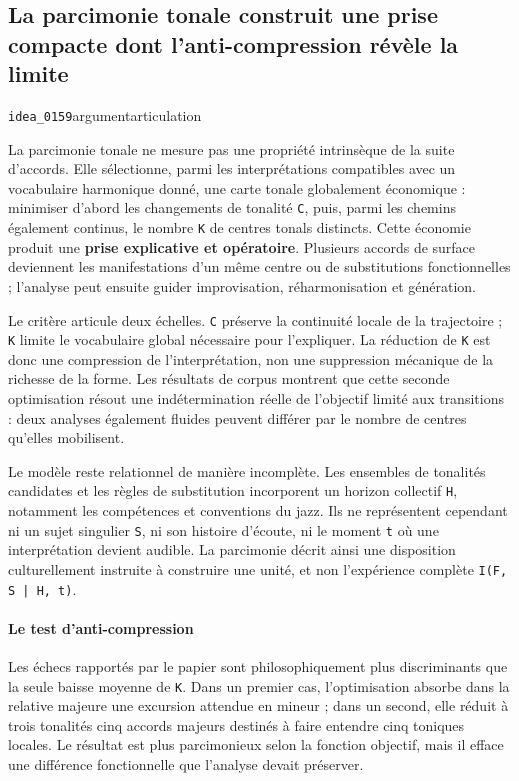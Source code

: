 \documentclass[10pt,a4paper]{article}
\begin{document}
\subsection{La parcimonie tonale construit une prise compacte dont l'anti-compression révèle la limite}
{\small\color{metadata} \texttt{idea\_0159}\quad\textbullet\quad argument\quad\textbullet\quad articulation\par}

La parcimonie tonale ne mesure pas une propriété intrinsèque de la suite d'accords. Elle sélectionne, parmi les interprétations compatibles avec un vocabulaire harmonique donné, une carte tonale globalement économique : minimiser d'abord les changements de tonalité \texttt{C}, puis, parmi les chemins également continus, le nombre \texttt{K} de centres tonals distincts. Cette économie produit une \textbf{prise explicative et opératoire}. Plusieurs accords de surface deviennent les manifestations d'un même centre ou de substitutions fonctionnelles ; l'analyse peut ensuite guider improvisation, réharmonisation et génération.

Le critère articule deux échelles. \texttt{C} préserve la continuité locale de la trajectoire ; \texttt{K} limite le vocabulaire global nécessaire pour l'expliquer. La réduction de \texttt{K} est donc une compression de l'interprétation, non une suppression mécanique de la richesse de la forme. Les résultats de corpus montrent que cette seconde optimisation résout une indétermination réelle de l'objectif limité aux transitions : deux analyses également fluides peuvent différer par le nombre de centres qu'elles mobilisent.

Le modèle reste relationnel de manière incomplète. Les ensembles de tonalités candidates et les règles de substitution incorporent un horizon collectif \texttt{H}, notamment les compétences et conventions du jazz. Ils ne représentent cependant ni un sujet singulier \texttt{S}, ni son histoire d'écoute, ni le moment \texttt{t} où une interprétation devient audible. La parcimonie décrit ainsi une disposition culturellement instruite à construire une unité, et non l'expérience complète \texttt{I(F, S | H, t)}.

\paragraph{Le test d'anti-compression}
Les échecs rapportés par le papier sont philosophiquement plus discriminants que la seule baisse moyenne de \texttt{K}. Dans un premier cas, l'optimisation absorbe dans la relative majeure une excursion attendue en mineur ; dans un second, elle réduit à trois tonalités cinq accords majeurs destinés à faire entendre cinq toniques locales. Le résultat est plus parcimonieux selon la fonction objectif, mais il efface une différence fonctionnelle que l'analyse devait préserver.
\end{document}

